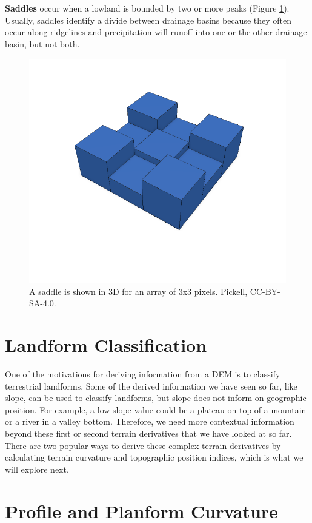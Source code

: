 \documentclass[
]{book}
\begin{document}
\textbf{Saddles} occur when a lowland is bounded by two or more peaks (Figure \ref{fig:9-saddle}). Usually, saddles identify a divide between drainage basins because they often occur along ridgelines and precipitation will runoff into one or the other drainage basin, but not both.

\begin{figure}
\includegraphics[width=0.75\linewidth]{images/09-saddle} \caption{A saddle is shown in 3D for an array of 3x3 pixels. Pickell, CC-BY-SA-4.0.}\label{fig:9-saddle}
\end{figure}

\hypertarget{landform-classification}{%
\section{Landform Classification}\label{landform-classification}}

One of the motivations for deriving information from a DEM is to classify terrestrial landforms. Some of the derived information we have seen so far, like slope, can be used to classify landforms, but slope does not inform on geographic position. For example, a low slope value could be a plateau on top of a mountain or a river in a valley bottom. Therefore, we need more contextual information beyond these first or second terrain derivatives that we have looked at so far. There are two popular ways to derive these complex terrain derivatives by calculating terrain curvature and topographic position indices, which is what we will explore next.

\hypertarget{profile-and-planform-curvature}{%
\section{Profile and Planform Curvature}\label{profile-and-planform-curvature}}
\end{document}
